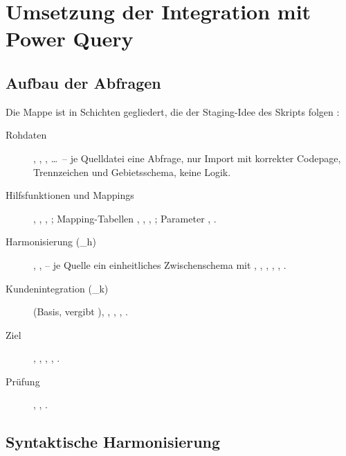 \section{Umsetzung der Integration mit Power Query}\label{sec:integration}


\subsection{Aufbau der Abfragen}\label{sec:aufbau}


Die Mappe ist in Schichten gegliedert, die der Staging-Idee des Skripts folgen :
\begin{description}
  \item[Rohdaten] , , , \dots\ -- je Quelldatei eine Abfrage, nur Import mit korrekter Codepage, Trennzeichen und Gebietsschema, keine Logik.
  \item[Hilfsfunktionen und Mappings] , , , ; Mapping-Tabellen , , , ; Parameter , .
  \item[Harmonisierung (\_h)] , ,  -- je Quelle ein einheitliches Zwischenschema mit , , , , , .
  \item[Kundenintegration (\_k)]  (Basis, vergibt ), , , , .
  \item[Ziel] , , , , .
  \item[Prüfung] , , .
\end{description}


\subsection{Syntaktische Harmonisierung}\label{sec:syntax}

